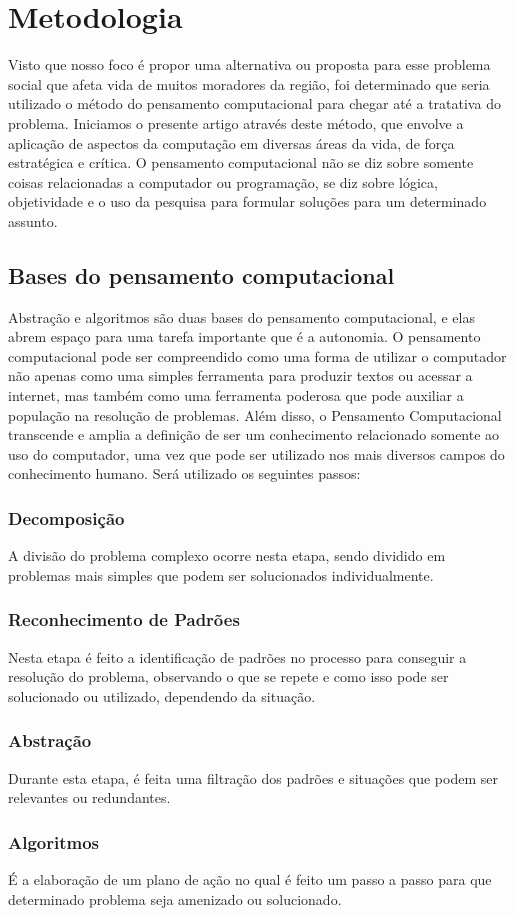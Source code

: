 \section{Metodologia}

Visto que nosso foco é propor uma alternativa ou proposta para esse problema
social que afeta vida de muitos moradores da região, foi determinado 
que seria utilizado o método do pensamento computacional para chegar até a 
tratativa do problema. Iniciamos o presente artigo através deste método, que 
envolve a aplicação de aspectos da computação em diversas áreas da vida, de força 
estratégica e crítica. O pensamento computacional não se diz sobre somente coisas 
relacionadas a computador ou programação, se diz sobre lógica, objetividade e o 
uso da pesquisa para formular soluções para um determinado assunto.

\subsection{Bases do pensamento computacional}

Abstração e algoritmos são duas bases do pensamento computacional, e elas 
abrem espaço para uma tarefa importante que é a autonomia. O pensamento 
computacional pode ser compreendido como uma forma de utilizar o 
computador não apenas como uma simples ferramenta para produzir textos ou 
acessar a internet, mas também como uma ferramenta poderosa que pode 
auxiliar a população na resolução de problemas. Além disso, o 
Pensamento Computacional transcende e amplia a definição de ser um 
conhecimento relacionado somente ao uso do computador, uma vez que pode 
ser utilizado nos mais diversos campos do conhecimento humano. Será utilizado
os seguintes passos:

\subsubsection{Decomposição}
A divisão do problema complexo ocorre nesta etapa, sendo dividido em problemas
mais simples que podem ser solucionados individualmente.

\subsubsection{Reconhecimento de Padrões}
Nesta etapa é feito a identificação de padrões no processo para conseguir a
resolução do problema, observando o que se repete e como isso pode ser 
solucionado ou utilizado, dependendo da situação. 

\subsubsection{Abstração}
Durante esta etapa, é feita uma filtração dos padrões e situações que podem 
ser relevantes ou redundantes. 

\subsubsection{Algoritmos}
É a elaboração de um plano de ação no qual é feito um passo a passo para que 
determinado problema seja amenizado ou solucionado.